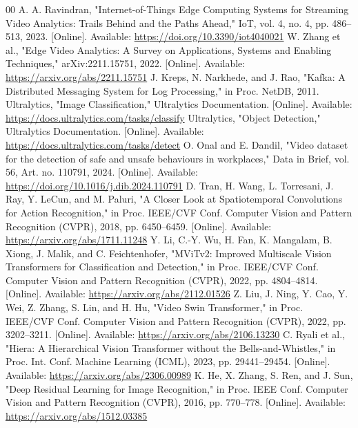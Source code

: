 \documentclass[conference]{IEEEtran}
\begin{document}
\begin{thebibliography}{00}
 A. A. Ravindran, "Internet-of-Things Edge Computing Systems for Streaming Video Analytics: Trails Behind and the Paths Ahead," IoT, vol. 4, no. 4, pp. 486--513, 2023. [Online]. Available: \url{https://doi.org/10.3390/iot4040021}
 W. Zhang et al., "Edge Video Analytics: A Survey on Applications, Systems and Enabling Techniques," arXiv:2211.15751, 2022. [Online]. Available: \url{https://arxiv.org/abs/2211.15751}
 J. Kreps, N. Narkhede, and J. Rao, "Kafka: A Distributed Messaging System for Log Processing," in Proc. NetDB, 2011.
 Ultralytics, "Image Classification," Ultralytics Documentation. [Online]. Available: \url{https://docs.ultralytics.com/tasks/classify}
 Ultralytics, "Object Detection," Ultralytics Documentation. [Online]. Available: \url{https://docs.ultralytics.com/tasks/detect}
 O. Onal and E. Dandil, "Video dataset for the detection of safe and unsafe behaviours in workplaces," Data in Brief, vol. 56, Art. no. 110791, 2024. [Online]. Available: \url{https://doi.org/10.1016/j.dib.2024.110791}
 D. Tran, H. Wang, L. Torresani, J. Ray, Y. LeCun, and M. Paluri, "A Closer Look at Spatiotemporal Convolutions for Action Recognition," in Proc. IEEE/CVF Conf. Computer Vision and Pattern Recognition (CVPR), 2018, pp. 6450--6459. [Online]. Available: \url{https://arxiv.org/abs/1711.11248}
 Y. Li, C.-Y. Wu, H. Fan, K. Mangalam, B. Xiong, J. Malik, and C. Feichtenhofer, "MViTv2: Improved Multiscale Vision Transformers for Classification and Detection," in Proc. IEEE/CVF Conf. Computer Vision and Pattern Recognition (CVPR), 2022, pp. 4804--4814. [Online]. Available: \url{https://arxiv.org/abs/2112.01526}
 Z. Liu, J. Ning, Y. Cao, Y. Wei, Z. Zhang, S. Lin, and H. Hu, "Video Swin Transformer," in Proc. IEEE/CVF Conf. Computer Vision and Pattern Recognition (CVPR), 2022, pp. 3202--3211. [Online]. Available: \url{https://arxiv.org/abs/2106.13230}
 C. Ryali et al., "Hiera: A Hierarchical Vision Transformer without the Bells-and-Whistles," in Proc. Int. Conf. Machine Learning (ICML), 2023, pp. 29441--29454. [Online]. Available: \url{https://arxiv.org/abs/2306.00989}
 K. He, X. Zhang, S. Ren, and J. Sun, "Deep Residual Learning for Image Recognition," in Proc. IEEE Conf. Computer Vision and Pattern Recognition (CVPR), 2016, pp. 770--778. [Online]. Available: \url{https://arxiv.org/abs/1512.03385}

\end{thebibliography}
\end{document}
